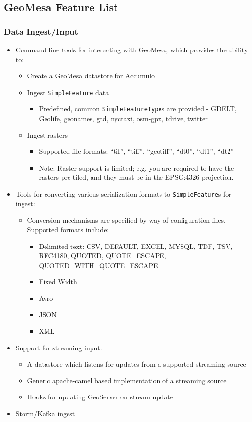 \subsection{GeoMesa Feature List}
\label{appendix:features:geomesa}

\subsubsection*{Data Ingest/Input}

\begin{itemize}
\item{Command line tools for interacting with GeoMesa, which provides the ability to:
  \begin{itemize}
  \item Create a GeoMesa datastore for Accumulo
  \item{Ingest \texttt{SimpleFeature} data
    \begin{itemize}
    \item Predefined, common \texttt{SimpleFeatureType}s are provided - GDELT, Geolife, geonames, gtd, nyctaxi, osm-gpx, tdrive, twitter
    \end{itemize}
  }
  \item{Ingest rasters
    \begin{itemize}
    \item Supported file formats: ``tif'', ``tiff'', ``geotiff'', ``dt0'', ``dt1'', ``dt2''
    \item Note: Raster support is limited; e.g. you are required to have the rasters pre-tiled, and they must be in the EPSG:4326 projection.
    \end{itemize}
  }
  \end{itemize}
}
\item{Tools for converting various serialization formats to \texttt{SimpleFeature}s for ingest:
  \begin{itemize}
  \item{Conversion mechanisms are specified by way of configuration files.  Supported formats include:
    \begin{itemize}
    \item Delimited text: CSV, DEFAULT, EXCEL, MYSQL, TDF, TSV, RFC4180, QUOTED, QUOTE\_ESCAPE, QUOTED\_WITH\_QUOTE\_ESCAPE
    \item Fixed Width
    \item Avro
    \item JSON
    \item XML
    \end{itemize}
  }
  \end{itemize}
}
\item{Support for streaming input:
  \begin{itemize}
  \item A datastore which listens for updates from a supported streaming source
  \item Generic apache-camel based implementation of a streaming source
  \item Hooks for updating GeoServer on stream update
  \end{itemize}
}
\item Storm/Kafka ingest
\end{itemize}


